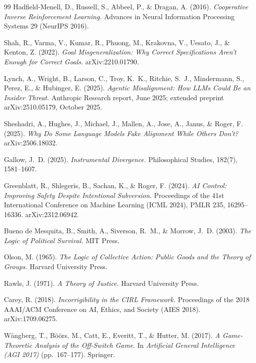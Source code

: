 \documentclass[11pt]{article}
\theoremstyle{definition}
\begin{document}
\begin{thebibliography}{99}
Hadfield-Menell, D., Russell, S., Abbeel, P., \& Dragan, A. (2016). \emph{Cooperative Inverse Reinforcement Learning.} Advances in Neural Information Processing Systems 29 (NeurIPS 2016).

Shah, R., Varma, V., Kumar, R., Phuong, M., Krakovna, V., Uesato, J., \& Kenton, Z. (2022). \emph{Goal Misgeneralization: Why Correct Specifications Aren't Enough for Correct Goals.} arXiv:2210.01790.

Lynch, A., Wright, B., Larson, C., Troy, K.~K., Ritchie, S.~J., Mindermann, S., Perez, E., \& Hubinger, E. (2025). \emph{Agentic Misalignment: How LLMs Could Be an Insider Threat.} Anthropic Research report, June 2025; extended preprint arXiv:2510.05179, October 2025.

Sheshadri, A., Hughes, J., Michael, J., Mallen, A., Jose, A., Janus, \& Roger, F. (2025). \emph{Why Do Some Language Models Fake Alignment While Others Don't?} arXiv:2506.18032.

Gallow, J.~D. (2025). \emph{Instrumental Divergence.} Philosophical Studies, 182(7), 1581--1607.

Greenblatt, R., Shlegeris, B., Sachan, K., \& Roger, F. (2024). \emph{AI Control: Improving Safety Despite Intentional Subversion.} Proceedings of the 41st International Conference on Machine Learning (ICML 2024), PMLR 235, 16295--16336. arXiv:2312.06942.

 Bueno de Mesquita, B., Smith, A., Siverson, R.~M., \& Morrow, J.~D. (2003). \emph{The Logic of Political Survival.} MIT Press.

 Olson, M. (1965). \emph{The Logic of Collective Action: Public Goods and the Theory of Groups.} Harvard University Press.

 Rawls, J. (1971). \emph{A Theory of Justice.} Harvard University Press.

Carey, R. (2018). \emph{Incorrigibility in the CIRL Framework.} Proceedings of the 2018 AAAI/ACM Conference on AI, Ethics, and Society (AIES 2018). arXiv:1709.06275.

W\"angberg, T., B\"o\"ors, M., Catt, E., Everitt, T., \& Hutter, M. (2017). \emph{A Game-Theoretic Analysis of the Off-Switch Game.} In \emph{Artificial General Intelligence (AGI 2017)} (pp.~167--177). Springer.


\end{thebibliography}
\end{document}
